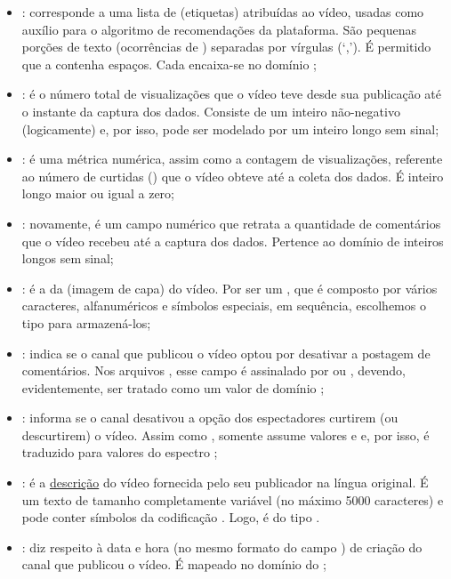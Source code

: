 \begin{itemize}
    \item {}: corresponde a uma lista de  (etiquetas) atribuídas ao vídeo, usadas como auxílio para o algoritmo de recomendações da plataforma. São pequenas porções de texto (ocorrências de ) separadas por vírgulas (`,'). É permitido que a  contenha espaços. Cada  encaixa-se no domínio ;
    \item {}: é o número total de visualizações que o vídeo teve desde sua publicação até o instante da captura dos dados. Consiste de um inteiro não-negativo (logicamente) e, por isso, pode ser modelado por um inteiro longo sem sinal;
    \item {}: é uma métrica numérica, assim como a contagem de visualizações, referente ao número de curtidas () que o vídeo obteve até a coleta dos dados. É inteiro longo maior ou igual a zero;
    \item {}: novamente, é um campo numérico que retrata a quantidade de comentários que o vídeo recebeu até a captura dos dados. Pertence ao domínio de inteiros longos sem sinal;
    \item {}: é a  da  (imagem de capa) do vídeo. Por ser um , que é composto por vários caracteres, alfanuméricos e símbolos especiais, em sequência, escolhemos o tipo  para armazená-los;
    \item {}: indica se o canal que publicou o vídeo optou por desativar a postagem de comentários. Nos arquivos , esse campo é assinalado por  ou , devendo, evidentemente, ser tratado como um valor de domínio ;
    \item {}: informa se o canal desativou a opção dos espectadores curtirem (ou descurtirem) o vídeo. Assim como , somente assume valores  e  e, por isso, é traduzido para valores do espectro ;
    \item {}: é a \href{https://developers.google.com/youtube/v3/docs/videos?hl=pt-br#snippet.description}{descrição} do vídeo fornecida pelo seu publicador na língua original. É um texto de tamanho completamente variável (no máximo 5000 caracteres) e pode conter símbolos da codificação . Logo, é do tipo .
    \item {}: diz respeito à data e hora (no mesmo formato  do campo ) de criação do canal que publicou o vídeo. É mapeado no domínio  do ;

\end{itemize}
